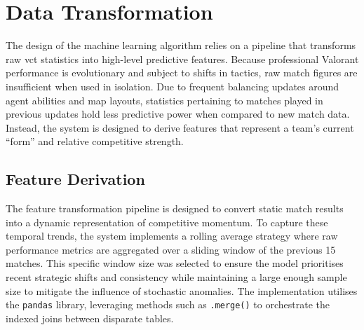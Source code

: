 \section{Data Transformation}
The design of the machine learning algorithm relies on a pipeline that transforms raw \gls{vct} statistics into high-level predictive features. Because professional Valorant performance is evolutionary and subject to shifts in tactics, raw match figures are insufficient when used in isolation. Due to frequent balancing updates around agent abilities and map layouts, statistics pertaining to matches played in previous updates hold less predictive power when compared to new match data. Instead, the system is designed to derive features that represent a team's current ``form'' and relative competitive strength.

\subsection{Feature Derivation}
The feature transformation pipeline is designed to convert static match results into a dynamic representation of competitive momentum. To capture these temporal trends, the system implements a rolling average strategy where raw performance metrics are aggregated over a sliding window of the previous 15 matches. This specific window size was selected to ensure the model prioritises recent strategic shifts and consistency while maintaining a large enough sample size to mitigate the influence of stochastic anomalies. The implementation utilises the \texttt{pandas} library, leveraging methods such as \texttt{.merge()} to orchestrate the indexed joins between disparate tables.

